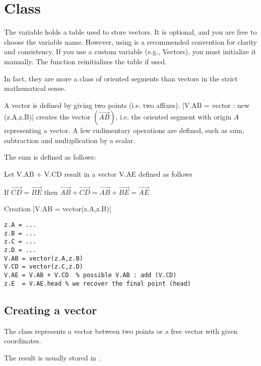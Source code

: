 \newpage

\section{Class }
\label{sec:class_vector}
The variable  holds a table used to store vectors. It is optional, and you are free to choose the variable name. However, using  is a recommended convention for clarity and consistency. If you use a custom variable (e.g., Vectors), you must initialize it manually. The  function reinitializes the  table if used.

\vspace{1em}
In fact, they are more a class of oriented segments than vectors in the strict mathematical sense.

A vector is defined by giving two points (i.e. two affixes).
|V.AB = vector : new (z.A,z.B)| creates the vector $(\overrightarrow{AB})$, i.e. the oriented segment with origin $A$ representing a vector. A few rudimentary operations are defined, such as sum, subtraction and multiplication by a scalar.

The sum is defined as follows:

Let V.AB + V.CD result in a vector V.AE defined as follows

If $\overrightarrow{CD} = \overrightarrow{BE} $ then $\overrightarrow{AB} + \overrightarrow{CD} = \overrightarrow{AB} + \overrightarrow{BE} =\overrightarrow{AE}$

\begin{mybox}
   Creation |V.AB = vector(z.A,z.B)|
\end{mybox}

\begin{verbatim}
z.A = ...
z.B = ...
z.C = ...
z.D = ...
V.AB = vector(z.A,z.B)
V.CD = vector(z.C,z.D)
V.AE = V.AB + V.CD  % possible V.AB : add (V.CD)
z.E  = V.AE.head % we recover the final point (head)
\end{verbatim}


\subsection{Creating a vector}
\label{sub:creating_a_vector}

The  class represents a vector between two points or a free vector with given coordinates.

\medskip
The result is usually stored in .



